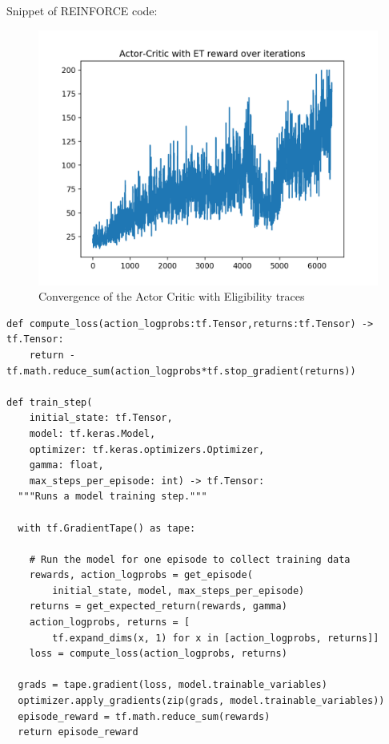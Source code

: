 \documentclass{article}[12pt]
\begin{document}
Snippet of REINFORCE code:
\begin{figure}[h]
  \includegraphics[width=\linewidth]{AC_conv.png}
  \caption{Convergence of the Actor Critic with Eligibility traces}
  \label{fig:optPol1}
\end{figure}

\begin{lstlisting}
def compute_loss(action_logprobs:tf.Tensor,returns:tf.Tensor) -> tf.Tensor:
    return -tf.math.reduce_sum(action_logprobs*tf.stop_gradient(returns))

def train_step(
    initial_state: tf.Tensor, 
    model: tf.keras.Model, 
    optimizer: tf.keras.optimizers.Optimizer, 
    gamma: float, 
    max_steps_per_episode: int) -> tf.Tensor:
  """Runs a model training step."""

  with tf.GradientTape() as tape:

    # Run the model for one episode to collect training data
    rewards, action_logprobs = get_episode(
        initial_state, model, max_steps_per_episode) 
    returns = get_expected_return(rewards, gamma)
    action_logprobs, returns = [
        tf.expand_dims(x, 1) for x in [action_logprobs, returns]] 
    loss = compute_loss(action_logprobs, returns)

  grads = tape.gradient(loss, model.trainable_variables)
  optimizer.apply_gradients(zip(grads, model.trainable_variables))
  episode_reward = tf.math.reduce_sum(rewards)
  return episode_reward
\end{lstlisting}
\end{document}
